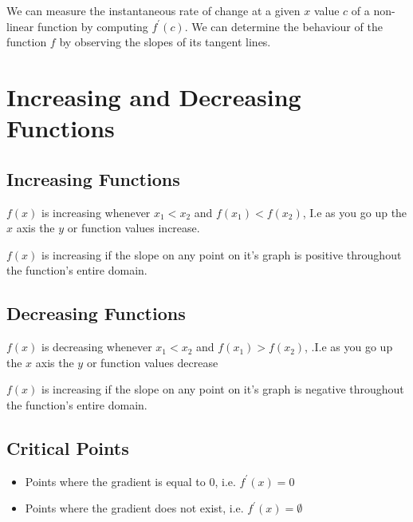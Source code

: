 \documentclass[12pt letter]{report}
\begin{document}
We can measure the instantaneous rate of change at a given $x$ value $c$ of a non-linear function by computing $f^{\prime}(c)$. We can determine the behaviour of the function $f$ by observing the slopes of its tangent lines.

\section{Increasing and Decreasing Functions}
\subsection{Increasing Functions}

$f(x)$ is increasing whenever $x_1 < x_2$ and $f(x_1) < f(x_2)$, I.e as you go up the $x$ axis the $y$ or function values increase.

$f(x)$ is increasing if the slope on any point on it's graph is positive throughout the function's entire domain.

\subsection{Decreasing Functions}
$f(x)$ is decreasing whenever $x_1 < x_2$ and $f(x_1) > f(x_2)$, .I.e as you go up the $x$ axis the $y$ or function values decrease

$f(x)$ is increasing if the slope on any point on it's graph is negative throughout the function's entire domain.

\subsection{Critical Points}

\begin{itemize}
	\item Points where the gradient is equal to 0, i.e. $f^{\prime}(x) = 0$
	\item Points where the gradient does not exist, i.e. $f^{\prime}(x) = \emptyset$
\end{itemize}
\end{document}
